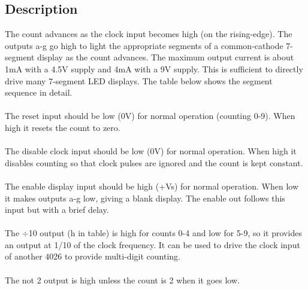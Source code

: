\documentclass{article}[18pt]
\begin{document}
\subsection{Description}
The count advances as the clock input becomes high (on the rising-edge). The outputs a-g go
high to light the appropriate segments of a common-cathode 7-segment display as the count
advances. The maximum output current is about 1mA with a 4.5V supply and 4mA with a 9V
supply. This is sufficient to directly drive many 7-segment LED displays. The table below
shows the segment sequence in detail.\\
\\
The reset input should be low (0V) for normal operation (counting 0-9). When high it resets the count to zero.\\
\\
The disable clock input should be low (0V) for normal operation. When high it disables counting
so that clock pulses are ignored and the count is kept constant.\\
\\
The enable display input should be high (+Vs) for normal operation. When low it makes outputs
a-g low, giving a blank display. The enable out follows this input but with a brief delay.\\
\\
The $\div$10 output (h in table) is high for counts 0-4 and low for 5-9, so it provides an output at 1/10
of the clock frequency. It can be used to drive the clock input of another 4026 to provide
multi-digit counting.\\
\\
The not 2 output is high unless the count is 2 when it goes low.
\end{document}
